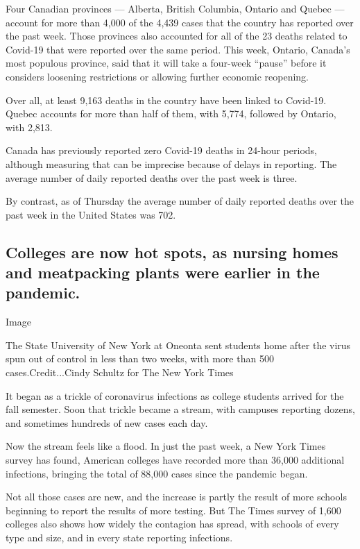 Four Canadian provinces --- Alberta, British Columbia, Ontario and
Quebec --- account for more than 4,000 of the 4,439 cases that the
country has reported over the past week. Those provinces also accounted
for all of the 23 deaths related to Covid-19 that were reported over the
same period. This week, Ontario, Canada's most populous province, said
that it will take a four-week ``pause'' before it considers loosening
restrictions or allowing further economic reopening.

Over all, at least 9,163 deaths in the country have been linked to
Covid-19. Quebec accounts for more than half of them, with 5,774,
followed by Ontario, with 2,813.

Canada has previously reported zero Covid-19 deaths in 24-hour periods,
although measuring that can be imprecise because of delays in reporting.
The average number of daily reported deaths over the past week is three.

By contrast, as of Thursday the average number of daily reported deaths
over the past week in the United States was 702.

\hypertarget{colleges-are-now-hot-spots-as-nursing-homes-and-meatpacking-plants-were-earlier-in-the-pandemic}{%
\subsection{Colleges are now hot spots, as nursing homes and meatpacking
plants were earlier in the
pandemic.}\label{colleges-are-now-hot-spots-as-nursing-homes-and-meatpacking-plants-were-earlier-in-the-pandemic}}

Image

The State University of New York at Oneonta sent students home after the
virus spun out of control in less than two weeks, with more than 500
cases.Credit...Cindy Schultz for The New York Times

It began as a trickle of coronavirus infections as college students
arrived for the fall semester. Soon that trickle became a stream, with
campuses reporting dozens, and sometimes hundreds of new cases each day.

Now the stream feels like a flood. In just the past week, a New York
Times survey has found, American colleges have recorded more than 36,000
additional infections, bringing the total of 88,000 cases since the
pandemic began.

Not all those cases are new, and the increase is partly the result of
more schools beginning to report the results of more testing. But The
Times survey of 1,600 colleges also shows how widely the contagion has
spread, with schools of every type and size, and in every state
reporting infections.

